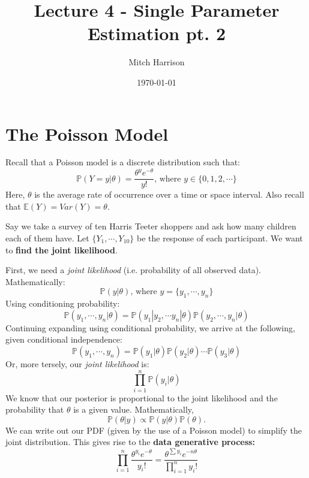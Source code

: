 \documentclass[titlepage, 12pt, leqno]{article}
\title{\Huge{Lecture 4 - Single Parameter Estimation pt. 2}}
\author{\large{Mitch Harrison}}
\date{\today}
\begin{document}
\setlength{\parskip}{1\baselineskip}
\setlength{\parindent}{15pt}
\maketitle
\tableofcontents
\newpage


\section{The Poisson Model}
Recall that a Poisson model is a discrete distribution such that:
\[
    \mathbb{P}(Y=y|\theta) = \frac{\theta^{y}e^{-\theta}}{y!} \text{,  where } y
    \in \{0,1,2, \cdots \}
\]
Here, $\theta$ is the average rate of occurrence over a time or space interval.
Also recall that $ \mathbb{E}(Y) = Var(Y) = \theta$.
\begin{ex}
    Say we take a survey of ten Harris Teeter shoppers and ask how many children
    each of them have. Let $\{Y_{1}, \cdots , Y_{10}\}$ be the response of each
    participant. We want to \textbf{find the joint likelihood}. 

    First, we need a \textit{joint likelihood} (i.e. probability of all
    observed data). Mathematically:
    \[
        \mathbb{P}(y|\theta) \text{,  where } y = \{y_{1}, \cdots ,y_{n}\}
    \]
    Using conditioning probability:
    \[
        \mathbb{P}(y_{1}, \cdots , y_{n}|\theta) = \mathbb{P}(y_{1} | y_{2},
        \cdots y_{n}|\theta)\mathbb{P}(y_{2}, \cdots ,y_{n}|\theta)
    \]
    Continuing expanding using conditional probability, we arrive at the
    following, given conditional independence:
    \[
       \mathbb{P}(y_{1}, \cdots , y_{n}) = \mathbb{P}(y_{1}|\theta)
        \mathbb{P}(y_{2}|\theta) \cdots \mathbb{P}(y_{3}|\theta)
    \]
    Or, more tersely, our \textit{joint likelihood} is:
    \[
        \prod_{i=1}^{n}\mathbb{P}(y_{i}|\theta)
    \]
    We know that our posterior is proportional to the joint likelihood and the
    probability that $\theta$ is a given value. Mathematically,
    \[
        \mathbb{P}(\theta|y) \propto \mathbb{P}(y|\theta)\mathbb{P}(\theta).
    \]
    We can write out our PDF (given by the use of a Poisson model) to simplify
    the joint distribution. This gives rise to the \textbf{data generative
    process:}
    \[
        \prod_{i=1}^{n}\frac{\theta^{y_{i}}e^{-\theta}}{y_{i}!} =
        \boxed{\frac{\theta^{\sum y_{i}}e^{-n\theta}}{ \prod_{i=1}^{n}y_{i}!}} 
    \]
\end{ex}
\end{document}

